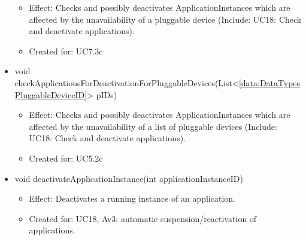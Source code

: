 \begin{description}
\begin{itemize}[noitemsep,nolistsep,leftmargin=-.25cm]
\begin{itemize}[noitemsep,nolistsep]
           \item Effect: Checks and possibly deactivates ApplicationInstances which are affected by the unavailability of a pluggable device (Include: UC18: Check and deactivate applications).
\item Created for: UC7.3c
        \end{itemize}
      \item \textsf{void checkApplicationsForDeactivationForPluggableDevices(List\textless{}\ref{data:DataTypesPluggableDeviceID}\textgreater{} pIDs)}
        \begin{itemize}[noitemsep,nolistsep]
           \item Effect: Checks and possibly deactivates ApplicationInstances which are affected by the unavailability of a list of pluggable devices (Include: UC18: Check and deactivate applications).
\item Created for: UC5.2c
        \end{itemize}
      \item \textsf{void deactivateApplicationInstance(int applicationInstanceID)}
        \begin{itemize}[noitemsep,nolistsep]
           \item Effect: Deactivates a running instance of an application.
\item Created for: UC18, Av3: automatic suspension/reactivation of applications.
        \end{itemize}
    \end{itemize}
    \end{description}

